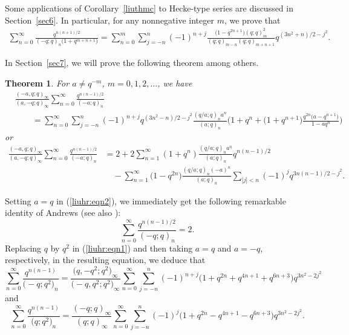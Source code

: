 \documentclass[pdftex]{sigma}
\numberwithin{equation}{section}
\newtheorem{Theorem}{Theorem}[section]
\begin{document}
Some applications of Corollary~\ref{liuthmc} to Hecke-type series are discussed in Section~\ref{sec6}. In particular, for any nonnegative integer $m$, we prove that
\begin{gather}\label{finitemock}
\sum_{n=0}^\infty \frac{q^{n(n+1)/2}}{(-q; q)_n \bigl(1+q^{m+n+1}\bigr)}
=\sum_{n=0}^m \sum_{j=-n}^n (-1)^{n+j} \frac{\bigl(1-q^{2n+1}\bigr)(q; q)^2_m}
{(q; q)_{m-n} (q; q)_{m+n+1}} q^{(3n^2+n)/2-j^2}.
\end{gather}

In Section~\ref{sec7}, we will prove the following theorem among others.
\begin{Theorem}\label{liuheckethm} For $a\not=q^{-m}$, $m=0, 1, 2, \ldots$, we have
	\begin{align}\label{liuhr:eqn1}
		&\frac{(-a, q; q)_\infty} {(a, -q; q)_\infty}\sum_{n=0}^\infty \frac{q^{n(n-1)/2}}{(-a; q)_n}\\
		&\qquad{}=\sum_{n=0}^\infty \sum_{j=-n}^n (-1)^{n+j} q^{(3n^2-n)/2-j^2} \frac{(q/a; q)_n a^n}{(a; q)_n}
		\biggl(1+q^n+\bigl(1+q^{n+1}\bigr)\frac{q^{2n}\bigl(a-q^{n+1}\bigr)}{1-aq^n}\biggr)\nonumber
	\end{align}		
	or
	\begin{align}
\frac{(-a, q; q)_\infty} {(a, -q; q)_\infty}\sum_{n=0}^\infty \frac{q^{n(n-1)/2}}{(-a; q)_n}
		 &{}=2+2\sum_{n=1}^\infty (1+q^n) \frac{(q/a; q)_n a^n}{(a; q)_n} q^{n(n-1)/2}\nonumber\\
		& \quad{}-\sum_{n=1}^\infty \bigl(1-q^{2n}\bigr)\frac{(q/a; q)_n (-a)^n}{(a; q)_n} \sum_{|j|<n} (-1)^j
		q^{3n(n-1)/2-j^2}.\label{liuhr:eqn2}
	\end{align}
\end{Theorem}	
 Setting $a=q$ in (\ref{liuhr:eqn2}), we immediately get the following remarkable identity of Andrews \mbox{\cite[equation~(4.4)]{Andrews1967}} (see also \cite[equation~(3.62)]{ChenWang2020}):
 \begin{equation*}%
 \sum_{n=0}^\infty \frac{q^{n(n-1)/2}}{(-q; q)_n}=2.
 \end{equation*}
Replacing $q$ by $q^2$ in (\ref{liuhr:eqn1}) and then taking $a=q$ and $a=-q$, respectively, in the resulting equation, we deduce that
\begin{equation*}%
\sum_{n=0}^\infty \frac{q^{n(n-1)}}{\bigl(-q; q^2\bigr)_n}
=\frac{\bigl(q, -q^2; q^2\bigr)_\infty}{\bigl(-q, q^2; q^2\bigr)_\infty}
\sum_{n=0}^\infty \sum_{j=-n}^n (-1)^{n+j} \bigl(1+q^{2n}+q^{4n+1}+q^{6n+3}\bigr)
q^{3n^2-2j^2}
\end{equation*}
and
\begin{equation*}%
	\sum_{n=0}^\infty \frac{q^{n(n-1)}}{\bigl(q; q^2\bigr)_n}
	=\frac{(-q; q)_\infty}{(q; q)_\infty}
	\sum_{n=0}^\infty \sum_{j=-n}^n (-1)^{j} \bigl(1+q^{2n}-q^{4n+1}-q^{6n+3}\bigr)
	q^{3n^2-2j^2}.
\end{equation*}
\end{document}
